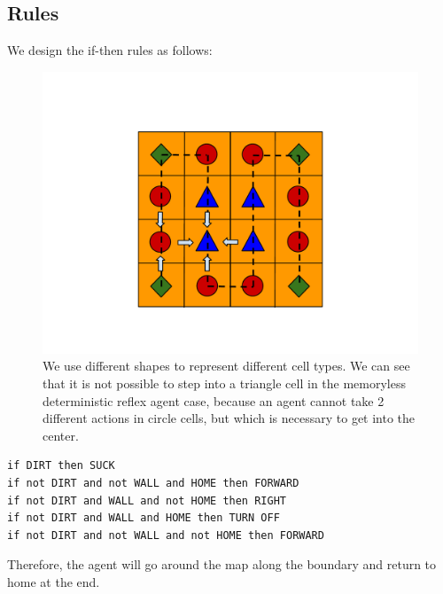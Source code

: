 \subsection{Rules}
We design the if-then rules as follows:

\begin{figure}[!t]
\centering
\includegraphics[scale=.35]{img/celltype.pdf}
\caption{We use different shapes to represent different cell types. We can see that it is not possible to step into a triangle cell in the memoryless deterministic reflex agent case, because an agent cannot take 2 different actions in circle cells, but which is necessary to get into the center.}
\label{fig:celltypes}
\end{figure}

\begin{verbatim}
if DIRT then SUCK 
if not DIRT and not WALL and HOME then FORWARD
if not DIRT and WALL and not HOME then RIGHT
if not DIRT and WALL and HOME then TURN OFF
if not DIRT and not WALL and not HOME then FORWARD
\end{verbatim}

Therefore, the agent will go around the map along the boundary and return to home at the end.
